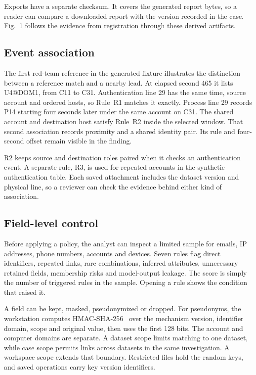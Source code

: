 \documentclass[conference]{IEEEtran}
\begin{document}
Exports have a separate checksum. It covers the generated report bytes, so a reader can compare a downloaded report with the version recorded in the case. Fig.~1 follows the evidence from registration through these derived artifacts.

\newpage
\subsection{Event association}
The first red-team reference in the generated fixture illustrates the distinction between a reference match and a nearby lead. At elapsed second 465 it lists \mbox{U4@DOM1}, from \mbox{C11} to \mbox{C31}. Authentication line 29 has the same time, source account and ordered hosts, so Rule~R1 matches it exactly. Process line 29 records \mbox{P14} starting four seconds later under the same account on \mbox{C31}. The shared account and destination host satisfy Rule~R2 inside the selected window. That second association records proximity and a shared identity pair. Its rule and four-second offset remain visible in the finding.

R2 keeps source and destination roles paired when it checks an authentication event. A separate rule, R3, is used for repeated accounts in the synthetic authentication table. Each saved attachment includes the dataset version and physical line, so a reviewer can check the evidence behind either kind of association.

\subsection{Field-level control}
Before applying a policy, the analyst can inspect a limited sample for emails, IP addresses, phone numbers, accounts and devices. Seven rules flag direct identifiers, repeated links, rare combinations, inferred attributes, unnecessary retained fields, membership risks and model-output leakage. The score is simply the number of triggered rules in the sample. Opening a rule shows the condition that raised it.

A field can be kept, masked, pseudonymized or dropped. For pseudonyms, the workstation computes HMAC-SHA-256~\cite{hmac} over the mechanism version, identifier domain, scope and original value, then uses the first 128 bits. The account and computer domains are separate. A dataset scope limits matching to one dataset, while case scope permits links across datasets in the same investigation. A workspace scope extends that boundary. Restricted files hold the random keys, and saved operations carry key version identifiers.
\end{document}
